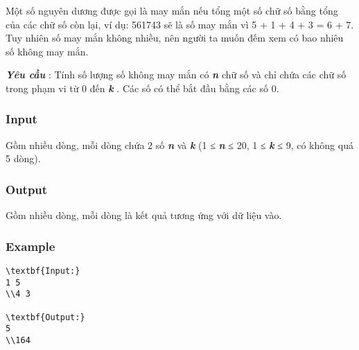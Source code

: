 



   Một số nguyên dương được gọi là may mắn nếu tổng một số chữ số bằng tổng của các chữ số còn lại, ví dụ: 561743 sẽ là số may mắn vì 5 + 1 + 4 + 3 = 6 + 7. Tuy nhiên số may mắn không nhiều, nên người ta muốn đếm xem có bao nhiêu số không may mắn.  

\textbf{\emph{     Yêu cầu    }}   : Tính số lượng số không may mắn có   \textbf{\emph{     n    }}   chữ số và chỉ chứa các chữ số trong phạm vi từ 0 đến   \textbf{\emph{     k    }}   . Các số có thể bắt đầu bằng các số 0.  

\subsubsection{   Input  }

   Gồm nhiều dòng, mỗi dòng chứa 2 số   \textbf{\emph{     n    }}   và   \textbf{\emph{     k    }}   (1 ≤   \textbf{\emph{     n    }}   ≤ 20, 1 ≤   \textbf{\emph{     k    }}   ≤ 9, có không quá 5 dòng).  

\subsubsection{   Output  }

   Gồm nhiều dòng, mỗi dòng là kết quả tương ứng với dữ liệu vào.  

\subsubsection{   Example  }
\begin{verbatim}
\textbf{Input:}
1 5
\\4 3

\textbf{Output:}
5
\\164 \end{verbatim}